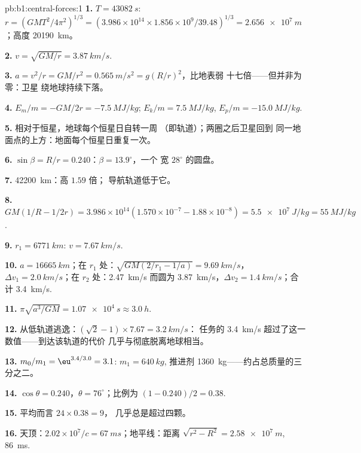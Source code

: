 \begin{solution}{pb:b1:central-forces:1}
\textbf{1.} $T = \qty{43082}{s}$: $r = (GMT^2/4\pi^2)^{1/3} = (3.986\times10^{14}
\times 1.856\times10^9/39.48)^{1/3} = \qty{2.656e7}{m}$；高度
\qty{20190}{km}。

\textbf{2.} $v = \sqrt{GM/r} = \qty{3.87}{km/s}$.

\textbf{3.} $a = v^2/r = GM/r^2 = \qty{0.565}{m/s^2} = g(R/r)^2$，比地表弱
十七倍——但并非为零：卫星
绕地球持续下落。

\textbf{4.} $E_m/m = -GM/2r = \qty{-7.5}{MJ/kg}$; $E_k/m = \qty{+7.5}{MJ/kg}$,
$E_p/m = \qty{-15.0}{MJ/kg}$.

\textbf{5.} 相对于恒星，地球每个恒星日自转一周
（即轨道）；两圈之后卫星回到
同一地面点的上方：地面每个恒星日重复一次。

\textbf{6.} $\sin\beta = R/r = 0.240$：$\beta = 13.9^\circ$，一个
宽 $28^\circ$ 的圆盘。

\textbf{7.}  \qty{42200}{km}：高 $1.59$ 倍；
导航轨道低于它。

\textbf{8.} $GM(1/R - 1/2r) = 3.986\times10^{14}(1.570\times10^{-7} - 1.88\times
10^{-8}) = \qty{5.5e7}{J/kg} = \qty{55}{MJ/kg}$.

\textbf{9.} $r_1 = \qty{6771}{km}$: $v = \qty{7.67}{km/s}$.

\textbf{10.} $a = \qty{16665}{km}$；在 $r_1$ 处：$\sqrt{GM(2/r_1 - 1/a)} =
\qty{9.69}{km/s}$，$\Delta v_1 = \qty{2.0}{km/s}$；在 $r_2$ 处：\qty{2.47}{km/s}
而圆为 \qty{3.87}{km/s}，$\Delta v_2 = \qty{1.4}{km/s}$；合计
\qty{3.4}{km/s}.

\textbf{11.} $\pi\sqrt{a^3/GM} = \qty{1.07e4}{s} \approx \qty{3.0}{h}$.

\textbf{12.} 从低轨道逃逸：$(\sqrt2 - 1)\times 7.67 = \qty{3.2}{km/s}$：
任务的 \qty{3.4}{km/s} 超过了这一数值——到达该轨道的代价
几乎与彻底脱离地球相当。

\textbf{13.} $m_0/m_1 = \eu^{3.4/3.0} = 3.1$: $m_1 = \qty{640}{kg}$,
推进剂 \qty{1360}{kg}——约占总质量的三分之二。

\textbf{14.} $\cos\theta = 0.240$，$\theta = 76^\circ$；比例为 $(1 - 0.240)/2
= 0.38$.

\textbf{15.} 平均而言 $24 \times 0.38 = 9$，
几乎总是超过四颗。

\textbf{16.} 天顶：$2.02\times10^7/c = \qty{67}{ms}$；地平线：距离
$\sqrt{r^2 - R^2} = \qty{2.58e7}{m}$, \qty{86}{ms}.


\end{solution}
